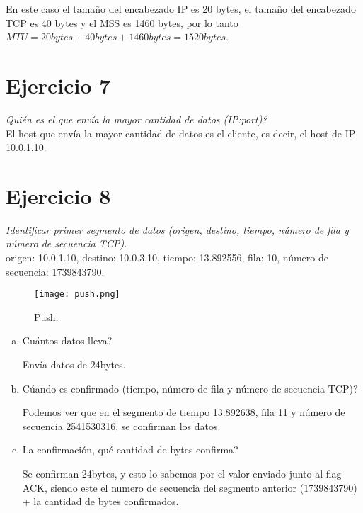 \documentclass[osajnl,twocolumn,showpacs,superscriptaddress,10pt]{revtex4-1} %
\begin{document}
En este caso el tamaño del encabezado IP es 20 bytes, el tamaño del encabezado TCP es 40 bytes y el MSS es 1460 bytes, 
por lo tanto $MTU = 20 bytes + 40 bytes + 1460 bytes = 1520 bytes$.

\section{Ejercicio 7}

\textit{Quién es el que envía la mayor cantidad de datos (IP:port)?} \\

El host que envía la mayor cantidad de datos es el cliente, es decir, el host de IP 10.0.1.10.

\newpage

\section{Ejercicio 8}

\textit{Identificar primer segmento de datos (origen, destino, tiempo, número de fila y número de secuencia TCP).} \\

origen: 10.0.1.10, destino: 10.0.3.10, tiempo: 13.892556, fila: 10, número de secuencia: 1739843790.

\begin{figure}[H]
    \centering
    \texttt{[image: push.png]}
    \caption{Push.}
    \label{push}
\end{figure}

\begin{enumerate}[a)]
    \item Cuántos datos lleva?

    Envía datos de 24bytes.

    \item Cúando es confirmado (tiempo, número de fila y número de secuencia TCP)?

    Podemos ver que en el segmento de tiempo 13.892638, fila 11 y número de secuencia 2541530316,
    se confirman los datos.

    \item La confirmación, qué cantidad de bytes confirma?

    Se confirman 24bytes, y esto lo sabemos por el valor enviado junto al flag ACK, siendo este el numero de secuencia
    del segmento anterior (1739843790) + la cantidad de bytes confirmados.
\end{enumerate}
\end{document}
